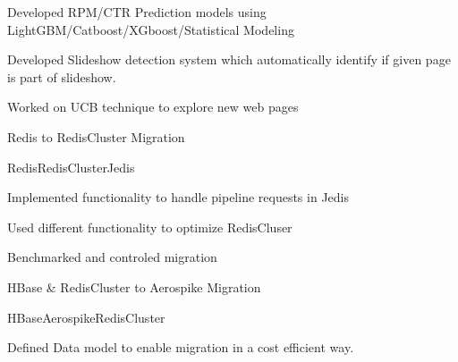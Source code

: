 \documentclass[10.5pt,a4paper]{article}
\begin{document}
\begin{multicols}{2}
\begin{desc}{Developed RPM/CTR Prediction models using LightGBM/Catboost/XGboost/Statistical Modeling}
\end{desc}
\begin{desc}{Developed Slideshow detection system which automatically identify if given page is part of slideshow.}
\end{desc}
\begin{desc}{Worked on UCB technique to explore new web pages}
\end{desc}
\begin{expsec}{Redis to RedisCluster Migration}
\end{expsec}
\begin{expsubsec}{Redis{\textbar}RedisCluster{\textbar}Jedis}
\end{expsubsec}
\begin{desc}{Implemented functionality to handle pipeline requests in Jedis}
\end{desc}
\begin{desc}{Used different functionality to optimize RedisCluser}
\end{desc}
\begin{desc}{Benchmarked and controled migration}
\end{desc}
\begin{expsec}{HBase \& RedisCluster to Aerospike Migration}
\end{expsec}
\begin{expsubsec}{HBase{\textbar}Aerospike{\textbar}RedisCluster}
\end{expsubsec}
\begin{desc}{Defined Data model to enable migration in a cost efficient way.}
\end{desc}








\end{multicols}
\end{document}
